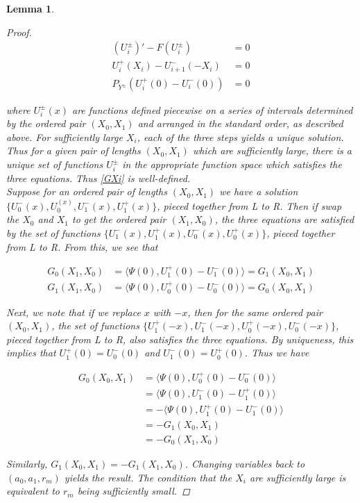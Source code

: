 \documentclass[12pt]{article}
\newtheorem{lemma}{Lemma}
\begin{document}
\begin{lemma}
\begin{proof}
\begin{align*}
(U_i^\pm)' - F(U_i^\pm) &= 0 \\
U_i^+(X_i) - U_{i+1}^-(-X_i) &= 0 \\
P_{Y^\pm}(U_i^+(0) - U_i^-(0)) &= 0
\end{align*}

where $U_i^\pm(x)$ are functions defined piecewise on a series of intervals determined by the ordered pair $(X_0, X_1)$ and arranged in the standard order, as described above. For sufficiently large $X_i$, each of the three steps yields a unique solution. Thus for a given pair of lengths $(X_0, X_1)$ which are sufficiently large, there is a unique set of functions $U_i^\pm$ in the appropriate function space which satisfies the three equations. Thus \eqref{GXi} is well-defined.
\\

Suppose for an ordered pair of lengths $(X_0, X_1)$ we have a solution $\{ U_0^-(x), U_0^(x), U_1^-(x), U_1^+(x) \}$, pieced together from L to R. Then if swap the $X_0$ and $X_1$ to get the ordered pair $(X_1, X_0)$, the three equations are satisfied by the set of functions $\{ U_1^-(x), U_1^+(x), U_0^-(x), U_0^+(x)\}$, pieced together from L to R. From this, we see that

\begin{align*}
G_0(X_1, X_0) &= \langle \Psi(0), U_1^+(0) - U_1^-(0) \rangle = G_1(X_0, X_1) \\
G_1(X_1, X_0) &= \langle \Psi(0), U_0^+(0) - U_0^-(0) \rangle = G_0(X_0, X_1)
\end{align*}

Next, we note that if we replace $x$ with $-x$, then for the same ordered pair $(X_0, X_1)$, the set of functions $\{ U_1^+(-x), U_1^-(-x), U_0^+(-x), U_0^-(-x)\}$, pieced together from L to R, also satisfies the three equations. By uniqueness, this implies that $U_1^+(0) = U_0^-(0)$ and $U_1^-(0) = U_0^+(0)$. Thus we have

\begin{align*}
G_0(X_0, X_1) &= \langle \Psi(0), U_0^+(0) - U_0^-(0) \rangle \\
&= \langle \Psi(0), U_1^-(0) - U_1^+(0) \rangle \\
&= -\langle \Psi(0), U_1^+(0) - U_1^-(0) \rangle \\
&= -G_1(X_0, X_1) \\
&= -G_0(X_1, X_0)
\end{align*}

Similarly, $G_1(X_0, X_1) = -G_1(X_1, X_0)$. Changing variables back to $(a_0, a_1, r_m)$ yields the result. The condition that the $X_i$ are sufficiently large is equivalent to $r_m$ being sufficiently small.

\end{proof}
\end{lemma}
\end{document}
